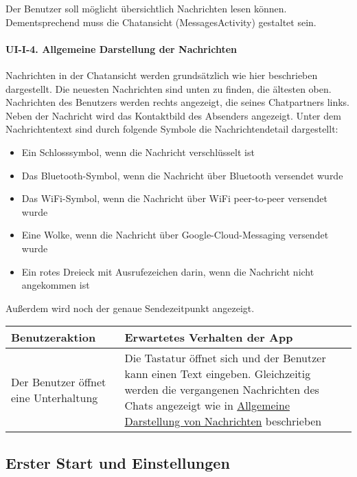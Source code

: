 Der Benutzer soll möglicht übersichtlich Nachrichten lesen können.
Dementsprechend muss die Chatansicht (MessagesActivity) gestaltet sein.

\paragraph{UI-I-4. Allgemeine Darstellung der
Nachrichten}\label{allgemeine-darstellung-der-nachrichten}

Nachrichten in der Chatansicht werden grundsätzlich wie hier beschrieben
dargestellt. Die neuesten Nachrichten sind unten zu finden, die ältesten
oben. Nachrichten des Benutzers werden rechts angezeigt, die seines
Chatpartners links. Neben der Nachricht wird das Kontaktbild des
Absenders angezeigt. Unter dem Nachrichtentext sind durch folgende
Symbole die Nachrichtendetail dargestellt:

\begin{itemize}
\tightlist
\item
  Ein Schlosssymbol, wenn die Nachricht verschlüsselt ist
\item
  Das Bluetooth-Symbol, wenn die Nachricht über Bluetooth versendet
  wurde
\item
  Das WiFi-Symbol, wenn die Nachricht über WiFi peer-to-peer versendet
  wurde
\item
  Eine Wolke, wenn die Nachricht über Google-Cloud-Messaging versendet
  wurde
\item
  Ein rotes Dreieck mit Ausrufezeichen darin, wenn die Nachricht nicht
  angekommen ist
\end{itemize}

Außerdem wird noch der genaue Sendezeitpunkt angezeigt.

\begin{longtable}{|p{8cm}|p{8.5cm}|}
\hline
Benutzeraktion & Erwartetes Verhalten der App\tabularnewline
\hline

Der Benutzer öffnet eine Unterhaltung & Die Tastatur öffnet sich und der
Benutzer kann einen Text eingeben. Gleichzeitig werden die vergangenen
Nachrichten des Chats angezeigt wie in
\href{Manueller-Test-UI\#allgemeine-darstellung-der-nachrichten}{Allgemeine
Darstellung von Nachrichten} beschrieben\tabularnewline
\hline
\end{longtable}

\clearpage
\subsection{ Erster Start und
Einstellungen}\label{ii-erster-start-und-einstellungen}

